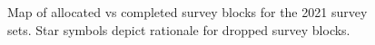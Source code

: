 \documentclass[12pt]{article}\usepackage[]{graphicx}\usepackage[]{color}
\begin{document}
\begin{figure}[htb]

{\centering {} 

}

\caption{Map of allocated vs completed survey blocks for the 2021 survey sets. Star symbols depict rationale for dropped survey blocks.}\label{fig:figure6}
\end{figure}
\clearpage
\end{document}
